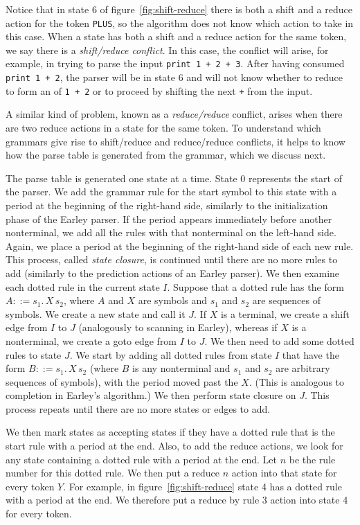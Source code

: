 \documentclass[7x10]{TimesAPriori_MIT}%
\numberwithin{theorem}{chapter}
\numberwithin{definition}{chapter}
\numberwithin{equation}{chapter}
\begin{document}
{Notice that in state 6 of figure~\ref{fig:shift-reduce} there is both
a shift and a reduce action for the token \lstinline{PLUS}, so the
algorithm does not know which action to take in this case. When a
state has both a shift and a reduce action for the same token, we say
there is a \emph{shift/reduce conflict}.  In this case, the conflict
will arise, for example, in trying to parse the input
\lstinline{print 1 + 2 + 3}. After having consumed \lstinline{print 1 + 2},
the parser will be in state 6 and will not know whether to
reduce to form an  of \lstinline{1 + 2} or 
to proceed by shifting the next \lstinline{+} from the input.

A similar kind of problem, known as a \emph{reduce/reduce} conflict,
arises when there are two reduce actions in a state for the same
token. To understand which grammars give rise to shift/reduce and
reduce/reduce conflicts, it helps to know how the parse table is
generated from the grammar, which we discuss next.

The parse table is generated one state at a time. State 0 represents
the start of the parser. We add the grammar rule for the start symbol
to this state with a period at the beginning of the right-hand side,
similarly to the initialization phase of the Earley parser.  If the
period appears immediately before another nonterminal, we add all the
rules with that nonterminal on the left-hand side. Again, we place a
period at the beginning of the right-hand side of each new
rule. This process, called \emph{state closure}, is continued
until there are no more rules to add (similarly to the prediction
actions of an Earley parser). We then examine each dotted rule in the
current state $I$. Suppose that a dotted rule has the form $A ::=
s_1.\,X \,s_2$, where $A$ and $X$ are symbols and $s_1$ and $s_2$
are sequences of symbols. We create a new state and call it $J$.  If $X$
is a terminal, we create a shift edge from $I$ to $J$ (analogously to
scanning in Earley), whereas if $X$ is a nonterminal, we create a
goto edge from $I$ to $J$.  We then need to add some dotted rules to
state $J$. We start by adding all dotted rules from state $I$ that
have the form $B ::= s_1.\,X\,s_2$ (where $B$ is any nonterminal and
$s_1$ and $s_2$ are arbitrary sequences of symbols), with
the period moved past the $X$.  (This is analogous to completion in
Earley's algorithm.)  We then perform state closure on $J$.  This
process repeats until there are no more states or edges to add.

We then mark states as accepting states if they have a dotted rule
that is the start rule with a period at the end.  Also, to add
the reduce actions, we look for any state containing a dotted rule
with a period at the end. Let $n$ be the rule number for this dotted
rule. We then put a reduce $n$ action into that state for every token
$Y$. For example, in figure~\ref{fig:shift-reduce} state 4 has a
dotted rule with a period at the end. We therefore put a reduce by
rule 3 action into state 4 for every
token.

}
\end{document}
